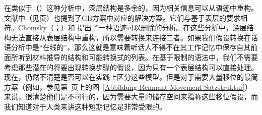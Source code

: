 在类似于（）这种分析中，深层结构是多余的，因为相关信息可以从语迹中重构。文献中（见\pageref{Seite-Representationelle-GB}页）也提到了GB方案中对应的解决方案。它们与基于表层的要求相符。Chomsky（\citeyear[]{Chomsky81a}；\citeyear[]{Chomsky86b}）和 \citet[--60]{LS92a-u}提出了一种语迹可以删除的分析。在这些分析中，深层结构无法直接从表层结构中重构，所以需要转换来连接二者。如果我们假设转换在话语分析中是“在线的”，那么这就是意味着听话人不得不在其工作记忆中保存自其前面所听到材料推导的结构和可能转换式的列表。在基于限制的语法中，我们不需要考虑那些潜在的将要出现转换步骤的假设，因为只有一个表层结构可以直接处理。现在，仍然不清楚是否可以在实践上区分这些模型。但是对于需要大量移位的最简方案（例如，参见第~\pageref{Abbildung-Remnant-Movement-Satzstruktur}页上的图~\ref{Abbildung-Remnant-Movement-Satzstruktur}）来说，很清楚他们是不可行的，因为需要大量的储存空间来指称这些移位假设，而我们知道对于人类来讲这种短期记忆是非常受限的。

